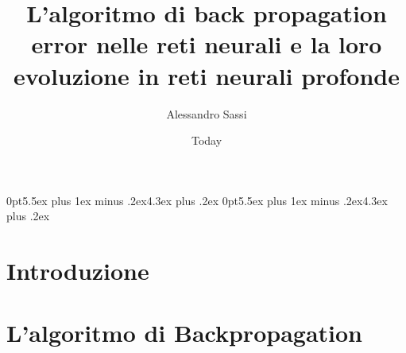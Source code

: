 \documentclass [12pt ,a4paper ,twoside ,openright ]{book}
\begin{document}
\title{L'algoritmo di back propagation error nelle reti neurali e la loro evoluzione in reti neurali profonde}
\author{Alessandro Sassi}
\date{Today}

\titlespacing*{\section}
{0pt}{5.5ex plus 1ex minus .2ex}{4.3ex plus .2ex}
\titlespacing*{\subsection}
{0pt}{5.5ex plus 1ex minus .2ex}{4.3ex plus .2ex}




\chapter*{Introduzione}
\vspace{-2cm}

\chapter*{L'algoritmo di Backpropagation }




\end{document}
